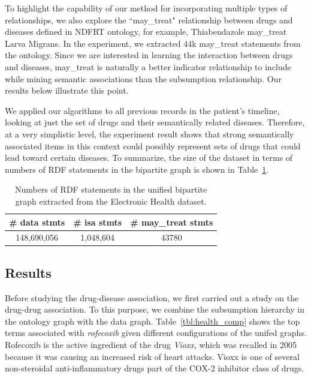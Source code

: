 To highlight the capability of our method for incorporating multiple types of relationships, we also explore the ``may\_treat" relationship between drugs and diseases defined in NDFRT ontology, for example, Thiabendazole may\_treat Larva Migrans. In the experiment, we extracted 44k may\_treat statements from the ontology. Since we are interested in learning the interaction between drugs and diseases, may\_treat is naturally a better indicator relationship to include while mining semantic associations than the subsumption relationship. Our results below illustrate this point.

We applied our algorithms to all previous records in the patient's timeline, looking at just the set of drugs and their semantically related diseases. Therefore, at a very simplistic level, the experiment result shows that strong semantically associated items in this context could possibly represent sets of drugs that could lead toward certain diseases. To summarize, the size of the dataset in terms of numbers of RDF statements in the bipartite graph is shown in Table~\ref{tbl:exp_overview}.


\begin{table}[tbh]\scriptsize
\begin{center}
\begin{tabular}{c|c|c}
\hline
  \# data stmts & \# isa stmts & \# may\_treat stmts \\
  \hline
  148,690,056  & 1,048,604 &    43780\\
  \hline
\end{tabular}
\end{center}
\caption{\label{tbl:exp_overview} Numbers of RDF statements in the unified bipartite graph extracted from the Electronic Health dataset. }
\end{table}


\subsection{Results}
Before studying the drug-disease association, we first carried out a study on the drug-drug association. To this purpose, we combine the subsumption hierarchy in the ontology graph with the data graph. Table~\ref{tbl:health_comp} shows the top terms associated with \emph{rofecoxib} given different configurations of the unifed graphs. Rofecoxib is the active ingredient of the drug \emph{Vioxx}, which was recalled in 2005 because it was causing an increased risk of heart attacks. Vioxx is one of several non-steroidal anti-inflammatory drugs part of the COX-2 inhibitor class of drugs.

